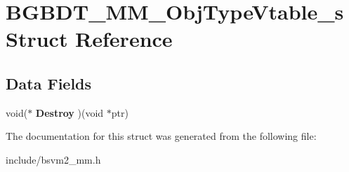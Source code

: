 \hypertarget{structBGBDT__MM__ObjTypeVtable__s}{\section{B\-G\-B\-D\-T\-\_\-\-M\-M\-\_\-\-Obj\-Type\-Vtable\-\_\-s Struct Reference}
\label{structBGBDT__MM__ObjTypeVtable__s}
}
\subsection*{Data Fields}
\begin{DoxyCompactItemize}
\item 
\hypertarget{structBGBDT__MM__ObjTypeVtable__s_aab8a2271cbb32411fb93e0614653caf2}{void($\ast$ {\bfseries Destroy} )(void $\ast$ptr)}\label{structBGBDT__MM__ObjTypeVtable__s_aab8a2271cbb32411fb93e0614653caf2}

\end{DoxyCompactItemize}


The documentation for this struct was generated from the following file\-:\begin{DoxyCompactItemize}
\item 
include/bsvm2\-\_\-mm.\-h\end{DoxyCompactItemize}
